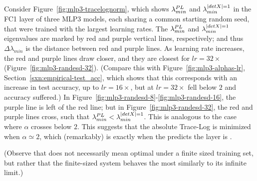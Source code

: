 Consider Figure~\ref{fig:mlp3-tracelognorm}, which shows $\lambda^{PL}_{min}$ and $\lambda^{\vert detX\vert=1}_{min}$ in the FC1 layer of three MLP3 models, each sharing a common starting random seed, that were trained with the largest learning rates.
The $\lambda^{PL}_{min}$ and $\lambda^{\vert detX\vert=1}_{min}$ eigenvalues are marked by red and purple vertical lines, respectively; and thus $\Delta \lambda_{min}$ is the distance between red and purple lines.
%
As learning rate increases, the red and purple lines draw closer, and they are closest for $lr=32\times$ (Figure~\ref{fig:mlp3-randesd-32}). 
(Compare this with Figure~\ref{fig:mlp3-alphas-lr}, Section~\ref{sxn:empirical-test_acc}, which shows that this corresponds with an increase in test accuracy, up to $lr=16\times$, but at $lr=32\times$ \ALPHA fell below $2$ and accuracy suffered.) 
In Figure~\ref{fig:mlp3-randesd-8}-\ref{fig:mlp3-randesd-16}, the purple line is left of the red line; but in Figure~\ref{fig:mlp3-randesd-32}, the red and purple lines cross, such that $\lambda^{PL}_{min} < \lambda^{\vert detX\vert=1}_{min}$.
This is analogous to the case where $\alpha$ crosses below $2$. 
This suggests that the absolute Trace-Log is minimized when $\alpha\simeq2$, which (remarkably) is exactly when the \HTSR \Phenomenology predicts the layer is \Ideal.

(Observe that \Ideal does not necessarily mean optimal under a finite sized training set, but rather that the finite-sized system behaves the most similarly to its infinite limit.)



